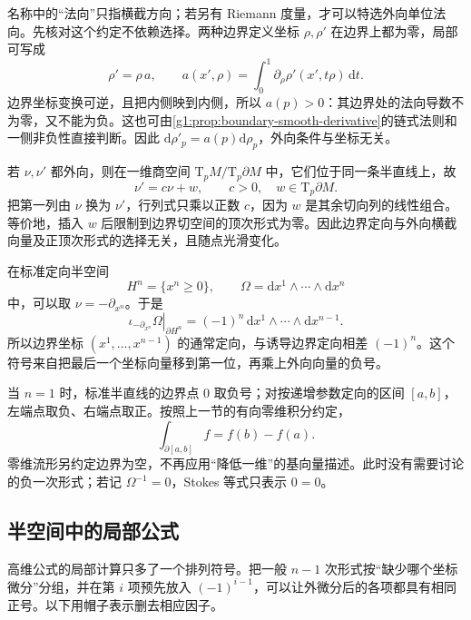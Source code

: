 名称中的“法向”只指横截方向；若另有 Riemann 度量，才可以特选外向单位法向。先核对这个约定不依赖选择。两种边界定义坐标 \(\rho,\rho'\) 在边界上都为零，局部可写成
\[
	\rho'=\rho\,a,\qquad
	a(x',\rho)=\int_0^1\partial_\rho\rho'(x',t\rho)\,\mathrm{d}t.
\]
边界坐标变换可逆，且把内侧映到内侧，所以 \(a(p)>0\)：其边界处的法向导数不为零，又不能为负。这也可由\cref{g1:prop:boundary-smooth-derivative}的链式法则和一侧非负性直接判断。因此 \(\mathrm{d}\rho'_p=a(p)\mathrm{d}\rho_p\)，外向条件与坐标无关。

\ProseParagraphBreak

若 \(\nu,\nu'\) 都外向，则在一维商空间 \(\mathrm{T}_pM/\mathrm{T}_p\partial M\) 中，它们位于同一条半直线上，故
\[
	\nu'=c\nu+w,\qquad c>0,\quad w\in \mathrm{T}_p\partial M.
\]
把第一列由 \(\nu\) 换为 \(\nu'\)，行列式只乘以正数 \(c\)，因为 \(w\) 是其余切向列的线性组合。等价地，插入 \(w\) 后限制到边界切空间的顶次形式为零。因此边界定向与外向横截向量及正顶次形式的选择无关，且随点光滑变化。

在标准定向半空间
\[
	H^n=\{x^n\ge0\},\qquad
	\Omega=\mathrm{d}x^1\wedge\cdots\wedge\mathrm{d}x^n
\]
中，可以取 \(\nu=-\partial_{x^n}\)。于是
\begin{equation}\label{g1:eq:half-space-boundary-orientation}
	\left.\iota_{-\partial_{x^n}}\Omega\right|_{\partial H^n}
	=(-1)^n\,\mathrm{d}x^1\wedge\cdots\wedge\mathrm{d}x^{n-1}.
\end{equation}
所以边界坐标 \((x^1,\ldots,x^{n-1})\) 的通常定向，与诱导边界定向相差 \((-1)^n\)。这个符号来自把最后一个坐标向量移到第一位，再乘上外向向量的负号。

\ProseParagraphBreak

当 \(n=1\) 时，标准半直线的边界点 \(0\) 取负号；对按递增参数定向的区间 \([a,b]\)，左端点取负、右端点取正。按照上一节的有向零维积分约定，
\[
	\int_{\partial[a,b]}f=f(b)-f(a).
\]
零维流形另约定边界为空，不再应用“降低一维”的基向量描述。此时没有需要讨论的负一次形式；若记 \(\Omega^{-1}=0\)，Stokes 等式只表示 \(0=0\)。

\subsection{半空间中的局部公式}
\label{g1:subsec:1404:02}

高维公式的局部计算只多了一个排列符号。把一般 \(n-1\) 次形式按“缺少哪个坐标微分”分组，并在第 \(i\) 项预先放入 \((-1)^{i-1}\)，可以让外微分后的各项都具有相同正号。以下用帽子表示删去相应因子。

